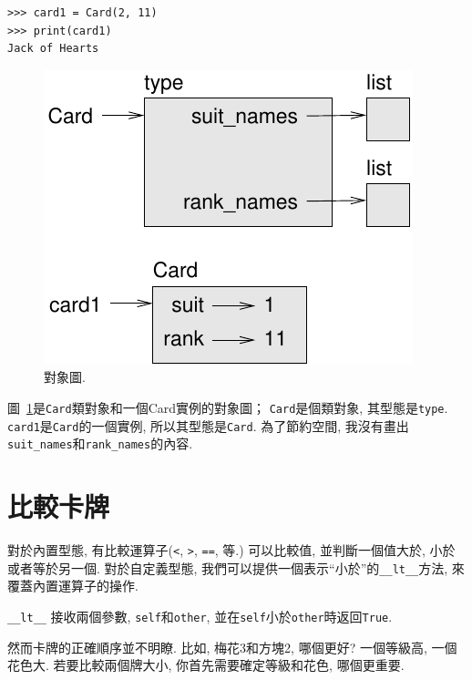 \documentclass[10pt]{book}
\begin{document}
\begin{verbatim}
>>> card1 = Card(2, 11)
>>> print(card1)
Jack of Hearts
\end{verbatim}

\begin{figure}
\centerline
{\includegraphics[scale=0.8]{figs/card1.pdf}}
\caption{對象圖.}
\label{fig.card1}
\end{figure}

圖~\ref{fig.card1}是{\tt Card}類對象和一個Card實例的對象圖；
{\tt Card}是個類對象, 其型態是{\tt type}.  
{\tt card1}是{\tt Card}的一個實例, 
所以其型態是{\tt Card}.
為了節約空間, 我沒有畫出\verb"suit_names"和\verb"rank_names"的內容. 
  


\section{比較卡牌}
\label{comparecard}

對於內置型態, 有比較運算子({\tt <}, {\tt >}, {\tt ==}, 等.)
可以比較值, 並判斷一個值大於, 小於或者等於另一個. 
對於自定義型態, 我們可以提供一個表示``小於''的\verb"__lt__"方法, 
來覆蓋內置運算子的操作. 

\verb"__lt__" 接收兩個參數, {\tt self}和{\tt other},
並在{\tt self}小於{\tt other}時返回{\tt True}.

然而卡牌的正確順序並不明瞭. 
比如, 梅花3和方塊2, 哪個更好?
一個等級高, 一個花色大. 
若要比較兩個牌大小, 你首先需要確定等級和花色, 哪個更重要. 
\end{document}
